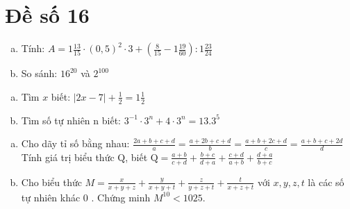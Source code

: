 \onehalfspacing
\section{Đề số 16}

\begin{bt} 
    \hfill
	\begin{enumerate}[a.]
		\item Tính: $A=1 \frac{13}{15} \cdot(0,5)^2 \cdot 3+\left(\frac{8}{15}-1 \frac{19}{60}\right): 1 \frac{23}{24}$
        \item So sánh: $16^{20}$ và $2^{100}$
	\end{enumerate}
	\loigiai{} 
\end{bt}

\begin{bt}
	\hfill
	\begin{enumerate}[a.]
		\item Tìm $x$ biết: $|2 x-7|+\frac{1}{2}=1 \frac{1}{2}$
        \item Tìm số tự nhiên $\mathrm{n}$ biết: $3^{-1} \cdot 3^n+4 \cdot 3^n=13.3^5$
	\end{enumerate}
	\loigiai{} 
\end{bt}

\begin{bt}
	\hfill
	\begin{enumerate}[a.]
		\item Cho dãy tỉ số bằng nhau: $\frac{2 a+b+c+d}{a}=\frac{a+2 b+c+d}{b}=\frac{a+b+2 c+d}{c}=\frac{a+b+c+2 d}{d}$ Tính giá trị biểu thức $\mathrm{Q}$, biết $\mathrm{Q}=\frac{a+b}{c+d}+\frac{b+c}{d+a}+\frac{c+d}{a+b}+\frac{d+a}{b+c}$
        \item Cho biểu thức $M=\frac{x}{x+y+z}+\frac{y}{x+y+t}+\frac{z}{y+z+t}+\frac{t}{x+z+t}$ với $x, y, z, t$ là các số tự nhiên khác 0 . Chứng minh $M^{10}<1025$.
    \end{enumerate}
	\loigiai{}
\end{bt}

